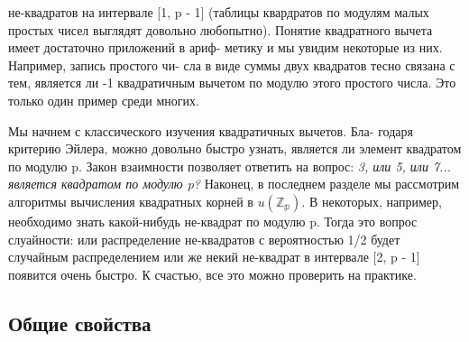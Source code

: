 \noindent не-квадратов на интервале [1, p - 1] (таблицы квардратов по модулям \linebreak малых простых чисел выглядят довольно любопытно). \linebreak
\indent Понятие квадратного вычета имеет достаточно приложений в ариф- \linebreak метику и мы увидим некоторые из них. Например, запись простого чи- \linebreak сла в виде суммы двух квадратов тесно связана с тем, является ли -1 \linebreak квадратичным вычетом по модулю этого простого числа. Это только \linebreak один пример среди многих. \par 
\indent Мы начнем с классического изучения квадратичных вычетов. Бла- \linebreak годаря критерию Эйлера, можно довольно быстро узнать, является ли \linebreak элемент квадратом по модулю p. Закон взаимности позволяет ответить \linebreak на вопрос: \textit{3, или 5, или 7... является квадратом по модулю p?} Наконец, в последнем разделе мы рассмотрим алгоритмы вычисления \linebreak квадратных корней в $u(\mathbb{Z_{p}})$. В некоторых, например, необходимо знать \linebreak какой-нибудь не-квадрат по модулю p. Тогда это вопрос слуайности: \linebreak или распределение не-квадратов с вероятностью 1/2 будет случайным \linebreak распределением или же некий не-квадрат в интервале [2, p - 1] появится \linebreak очень быстро. К счастью, все это можно проверить на практике. \par 

\subsection{Общие свойства}
 
